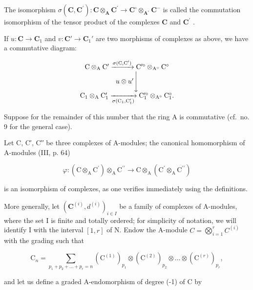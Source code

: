 The isomorphism \(\sigma(\mathbf{C},\mathbf{C}^{\prime}):\mathbf{C}\otimes_{\mathbf{A}}\mathbf{C}^{\prime}\to\mathbf{C}^{\circ}\otimes_{\mathbf{A}^{\circ}}\mathbf{C}^{-}\) is called the commutation isomorphism of the tensor product of the complexes \(\mathbf{C}\) and \(\mathbf{C}^{\prime}\) .

If \(u: \mathbf{C} \to \mathbf{C}_{1}\) and \(v: \mathbf{C}' \to \mathbf{C}_{1}'\) are two morphisms of complexes as above, we have a commutative diagram:

\[
\begin{array}{c} \mathrm{C} \otimes_ {\mathrm{A}} \mathrm{C} ^ {\prime} \xrightarrow {\sigma (\mathrm{C} , \mathrm{C} ^ {\prime})} \mathrm{C} ^ {\prime \circ} \otimes_ {\mathrm{A} ^ {\circ}} \mathrm{C} ^ {\circ} \\ u \otimes u ^ {\prime} \Bigg \downarrow \\ \mathrm{C} _ {1} \otimes_ {\mathrm{A}} \mathrm{C} _ {1} ^ {\prime} \xrightarrow [ \sigma (\mathrm{C} _ {1} , \mathrm{C} _ {1} ^ {\prime}) ]{} \mathrm{C} _ {1} ^ {\prime \circ} \otimes_ {\mathrm{A} ^ {\circ}} \mathrm{C} _ {1} ^ {\circ}. \end{array}
\]

Suppose for the remainder of this number that the ring A is commutative (cf.~no. 9 for the general case).

Let C, C′, C′′ be three complexes of A-modules; the canonical homomorphism of A-modules (III, p. 64)

\[
\varphi : \left(\mathrm{C} \otimes_ {\mathrm{A}} \mathrm{C} ^ {\prime}\right) \otimes_ {\mathrm{A}} \mathrm{C} ^ {\prime \prime} \rightarrow \mathrm{C} \otimes_ {\mathrm{A}} \left(\mathrm{C} ^ {\prime} \otimes_ {\mathrm{A}} \mathrm{C} ^ {\prime \prime}\right)
\]

is an isomorphism of complexes, as one verifies immediately using the definitions.

More generally, let \((\mathbf{C}^{(i)}, d^{(i)})_{i \in I}\) be a family of complexes of A-modules, where the set I is finite and totally ordered; for simplicity of notation, we will identify I with the interval \([1, r]\) of N. Endow the A-module \(C = \bigotimes_{i=1}^{r} C^{(i)}\) with the grading such that

\[
\mathrm{C} _ {n} = \sum_ {p _ {1} + p _ {2} + \dots + p _ {r} = n} (\mathrm{C} ^ {(1)}) _ {p _ {1}} \otimes (\mathrm{C} ^ {(2)}) _ {p _ {2}} \otimes \dots \otimes (\mathrm{C} ^ {(r)}) _ {p _ {r}},
\]

and let us define a graded A-endomorphism of degree (-1) of C by

